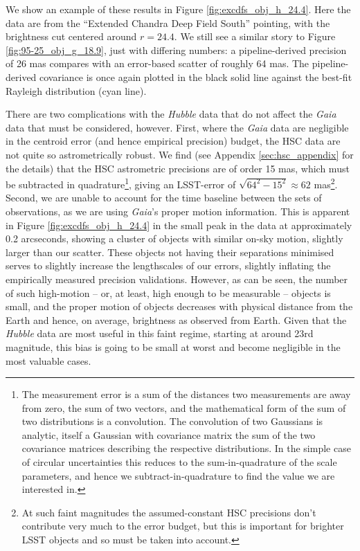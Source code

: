 \documentclass[SE,lsstdraft,authoryear,toc]{lsstdoc}
\begin{document}
We show an example of these results in Figure \ref{fig:excdfs_obj_h_24.4}.
Here the data are from the ``Extended Chandra Deep Field South'' pointing, with the brightness cut centered around $r=24.4$.
We still see a similar story to Figure \ref{fig:95-25_obj_g_18.9}, just with differing numbers: a pipeline-derived precision of 26 mas compares with an error-based scatter of roughly 64 mas.
The pipeline-derived covariance is once again plotted in the black solid line against the best-fit Rayleigh distribution (cyan line).

There are two complications with the \textit{Hubble} data that do not affect the \textit{Gaia} data that must be considered, however.
First, where the \textit{Gaia} data are negligible in the centroid error (and hence empirical precision) budget, the HSC data are not quite so astrometrically robust.
We find (see Appendix \ref{sec:hsc_appendix} for the details) that the HSC astrometric precisions are of order 15 mas, which must be subtracted in quadrature\footnote{The measurement error is a sum of the distances two measurements are away from zero, the sum of two vectors, and the mathematical form of the sum of two distributions is a convolution. The convolution of two Gaussians is analytic, itself a Gaussian with covariance matrix the sum of the two covariance matrices describing the respective distributions. In the simple case of circular uncertainties this reduces to the sum-in-quadrature of the scale parameters, and hence we subtract-in-quadrature to find the value we are interested in.}, giving an LSST-error of $\sqrt{64^2 - 15^2} \approx 62$ mas\footnote{At such faint magnitudes the assumed-constant HSC precisions don't contribute very much to the error budget, but this is important for brighter LSST objects and so must be taken into account.}.
Second, we are unable to account for the time baseline between the sets of observations, as we are using \textit{Gaia}'s proper motion information.
This is apparent in Figure \ref{fig:excdfs_obj_h_24.4} in the small peak in the data at approximately 0.2 arcseconds, showing a cluster of objects with similar on-sky motion, slightly larger than our scatter.
These objects not having their separations minimised serves to slightly increase the lengthscales of our errors, slightly inflating the empirically measured precision validations.
However, as can be seen, the number of such high-motion -- or, at least, high enough to be measurable -- objects is small, and the proper motion of objects decreases with physical distance from the Earth and hence, on average, brightness as observed from Earth.
Given that the \textit{Hubble} data are most useful in this faint regime, starting at around 23rd magnitude, this bias is going to be small at worst and become negligible in the most valuable cases.
\end{document}
